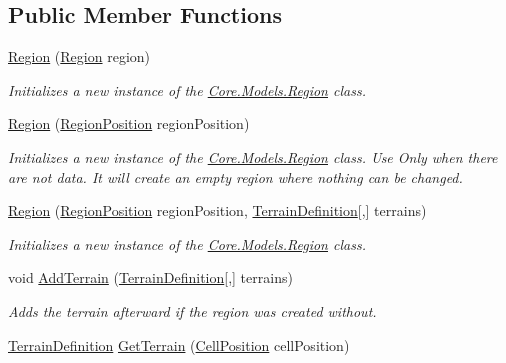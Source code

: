 \subsection*{Public Member Functions}
\begin{DoxyCompactItemize}
\item 
\hyperlink{classCore_1_1Models_1_1Region_a36ae96644a4ac7f34c2b608f56df38fc}{Region} (\hyperlink{classCore_1_1Models_1_1Region}{Region} region)
\begin{DoxyCompactList}\small\item\em Initializes a new instance of the \hyperlink{classCore_1_1Models_1_1Region}{Core.\+Models.\+Region} class. \end{DoxyCompactList}\item 
\hyperlink{classCore_1_1Models_1_1Region_a68736570a0df9f1e9b64d6a9d6744c02}{Region} (\hyperlink{classCore_1_1Models_1_1RegionPosition}{Region\+Position} region\+Position)
\begin{DoxyCompactList}\small\item\em Initializes a new instance of the \hyperlink{classCore_1_1Models_1_1Region}{Core.\+Models.\+Region} class. Use Only when there are not data. It will create an empty region where nothing can be changed. \end{DoxyCompactList}\item 
\hyperlink{classCore_1_1Models_1_1Region_afcf20af4ea09f9eed57e373a8a8210ea}{Region} (\hyperlink{classCore_1_1Models_1_1RegionPosition}{Region\+Position} region\+Position, \hyperlink{classCore_1_1Models_1_1Definitions_1_1TerrainDefinition}{Terrain\+Definition}\mbox{[},\mbox{]} terrains)
\begin{DoxyCompactList}\small\item\em Initializes a new instance of the \hyperlink{classCore_1_1Models_1_1Region}{Core.\+Models.\+Region} class. \end{DoxyCompactList}\item 
void \hyperlink{classCore_1_1Models_1_1Region_ad5e343aa96c3a1a28f5a98df87272cd9}{Add\+Terrain} (\hyperlink{classCore_1_1Models_1_1Definitions_1_1TerrainDefinition}{Terrain\+Definition}\mbox{[},\mbox{]} terrains)
\begin{DoxyCompactList}\small\item\em Adds the terrain afterward if the region was created without. \end{DoxyCompactList}\item 
\hyperlink{classCore_1_1Models_1_1Definitions_1_1TerrainDefinition}{Terrain\+Definition} \hyperlink{classCore_1_1Models_1_1Region_a1a49bf46e734963dc63aeb2cd2ce4063}{Get\+Terrain} (\hyperlink{classCore_1_1Models_1_1CellPosition}{Cell\+Position} cell\+Position)

\end{DoxyCompactItemize}
